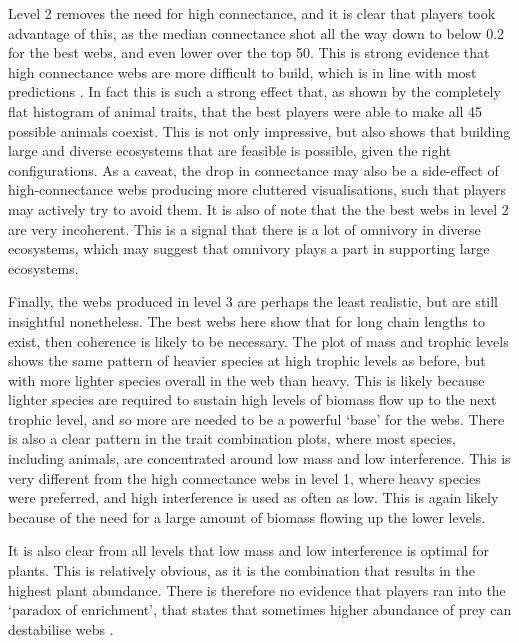 Level 2 removes the need for high connectance, and it is clear that players took advantage of this, as the median connectance shot all the way down to below 0.2 for the best webs, and even lower over the top 50. This is strong evidence that high connectance webs are more difficult to build, which is in line with most predictions \cite{May1973,Allesina2012}.
In fact this is such a strong effect that, as shown by the completely flat histogram of animal traits, that the best players were able to make all 45 possible animals coexist. This is not only impressive, but also shows that building large and diverse ecosystems that are feasible is possible, given the right configurations.
As a caveat, the drop in connectance may also be a side-effect of high-connectance webs producing more cluttered visualisations, such that players may actively try to avoid them.
It is also of note that the the best webs in level 2 are very incoherent. This is a signal that there is a lot of omnivory in diverse ecosystems, which may suggest that omnivory plays a part in supporting large ecosystems.

Finally, the webs produced in level 3 are perhaps the least realistic, but are still insightful nonetheless. The best webs here show that for long chain lengths to exist, then coherence is likely to be necessary. The plot of mass and trophic levels shows the same pattern of heavier species at high trophic levels as before, but with more lighter species overall in the web than heavy. This is likely because lighter species are required to sustain high levels of biomass flow up to the next trophic level, and so more are needed to be a powerful `base' for the webs.
There is also a clear pattern in the trait combination plots, where most species, including animals, are concentrated around low mass and low interference. This is very different from the high connectance webs in level 1, where heavy species were preferred, and high interference is used as often as low. This is again likely because of the need for a large amount of biomass flowing up the lower levels.

It is also clear from all levels that low mass and low interference is optimal for plants. This is relatively obvious, as it is the combination that results in the highest plant abundance. There is therefore no evidence that players ran into the `paradox of enrichment', that states that sometimes higher abundance of prey can destabilise webs \cite{Rosenzweig1971}.

